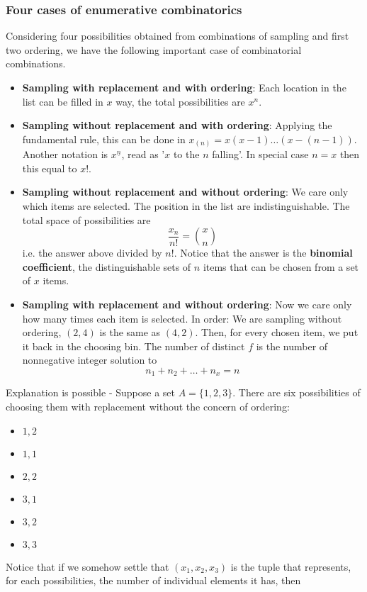 \subsubsection{Four cases of enumerative combinatorics}
Considering four possibilities obtained from combinations of sampling and first two ordering, we have the following important case of combinatorial combinations. 
\begin{itemize}[noitemsep,topsep=0pt]
    \item \textbf{Sampling with replacement and with ordering}: Each location in the list can be filled in $x$ way, the total possibilities are $x^{n}$. 
    \item \textbf{Sampling without replacement and with ordering}: Applying the fundamental rule, this can be done in $x_{(n)} =x(x-1)\dots(x-(n-1))$. Another notation is $x^{\underline{n}}$, read as '$x$ to the $n$ falling'. In special case $n=x$ then this equal to $x!$. 
    \item \textbf{Sampling without replacement and without ordering}: We care only which items are selected. The position in the list are indistinguishable. The total space of possibilities are $$\frac{x_{n}}{n!}= {x \choose n}$$ i.e. the answer above divided by $n!$. Notice that the answer is the \textbf{binomial coefficient}, the distinguishable sets of $n$ items that can be chosen from a set of $x$ items. 
    \item \textbf{Sampling with replacement and without ordering}: Now we care only how many times each item is selected. In order: We are sampling without ordering, $(2,4)$ is the same as $(4,2)$. Then, for every chosen item, we put it back in the choosing bin. The number of distinct $f$ is the number of nonnegative integer solution to $$n_{1}+n_{2}+\dots+n_{x}=n$$
\end{itemize}
Explanation is possible - Suppose a set $A=\{ 1,2,3 \}$. There are six possibilities of choosing them with replacement without the concern of ordering: 
\begin{itemize}[noitemsep,topsep=0pt]
    \item $1,2$
\item $1,1$
\item $2,2$
\item $3,1$
\item $3,2$
\item $3,3$
\end{itemize}
Notice that if we somehow settle that $(x_{1},x_{2},x_{3})$ is the tuple that represents, for each possibilities, the number of individual elements it has, then 

